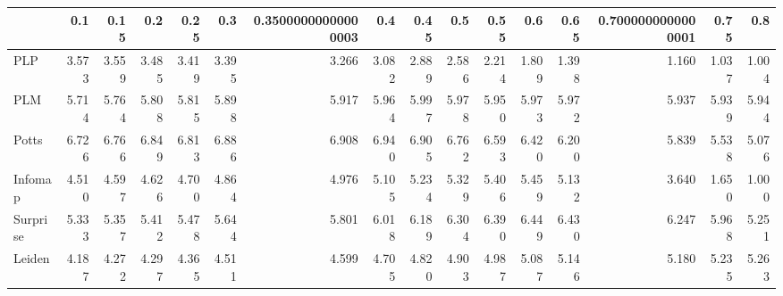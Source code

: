 \begin{tabular}{lrrrrrrrrrrrrrrr}
\toprule
{} &   0.1 &  0.15 &   0.2 &  0.25 &   0.3 & 0.35000000000000003 &   0.4 &  0.45 &   0.5 &  0.55 &   0.6 &  0.65 & 0.7000000000000001 &  0.75 &   0.8 \\
\midrule
PLP      & 3.573 & 3.559 & 3.485 & 3.419 & 3.395 &               3.266 & 3.082 & 2.889 & 2.586 & 2.214 & 1.809 & 1.398 &              1.160 & 1.037 & 1.004 \\
PLM      & 5.714 & 5.764 & 5.808 & 5.815 & 5.898 &               5.917 & 5.964 & 5.997 & 5.978 & 5.950 & 5.973 & 5.972 &              5.937 & 5.939 & 5.944 \\
Potts    & 6.726 & 6.766 & 6.849 & 6.813 & 6.886 &               6.908 & 6.940 & 6.905 & 6.762 & 6.593 & 6.420 & 6.200 &              5.839 & 5.538 & 5.076 \\
Infomap  & 4.510 & 4.597 & 4.626 & 4.700 & 4.864 &               4.976 & 5.105 & 5.234 & 5.329 & 5.406 & 5.459 & 5.132 &              3.640 & 1.650 & 1.000 \\
Surprise & 5.333 & 5.357 & 5.412 & 5.478 & 5.644 &               5.801 & 6.018 & 6.189 & 6.304 & 6.390 & 6.449 & 6.430 &              6.247 & 5.968 & 5.251 \\
Leiden   & 4.187 & 4.272 & 4.297 & 4.365 & 4.511 &               4.599 & 4.705 & 4.820 & 4.903 & 4.987 & 5.087 & 5.146 &              5.180 & 5.235 & 5.263 \\
\bottomrule
\end{tabular}
